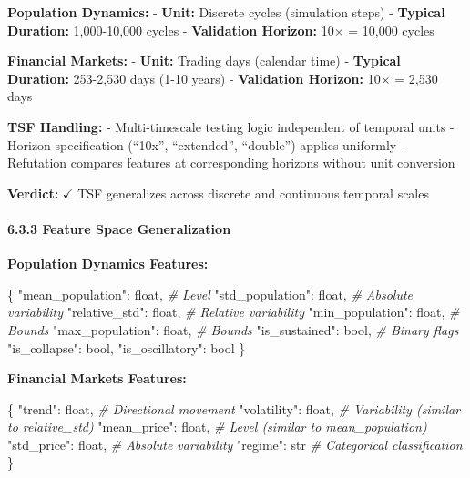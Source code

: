 \documentclass[
]{article}
\newenvironment{Shaded}{}{}
\newcommand{\BuiltInTok}[1]{\textcolor[rgb]{0.00,0.50,0.00}{#1}}
\newcommand{\CommentTok}[1]{\textcolor[rgb]{0.38,0.63,0.69}{\textit{#1}}}
\newcommand{\NormalTok}[1]{#1}
\newcommand{\StringTok}[1]{\textcolor[rgb]{0.25,0.44,0.63}{#1}}
\begin{document}
\textbf{Population Dynamics:} - \textbf{Unit:} Discrete cycles
(simulation steps) - \textbf{Typical Duration:} 1,000-10,000 cycles -
\textbf{Validation Horizon:} 10× = 10,000 cycles

\textbf{Financial Markets:} - \textbf{Unit:} Trading days (calendar
time) - \textbf{Typical Duration:} 253-2,530 days (1-10 years) -
\textbf{Validation Horizon:} 10× = 2,530 days

\textbf{TSF Handling:} - Multi-timescale testing logic independent of
temporal units - Horizon specification (``10x'', ``extended'',
``double'') applies uniformly - Refutation compares features at
corresponding horizons without unit conversion

\textbf{Verdict:} $\checkmark$ TSF generalizes across discrete and continuous
temporal scales

\paragraph{6.3.3 Feature Space
Generalization}\label{feature-space-generalization}

\textbf{Population Dynamics Features:}

\begin{Shaded}
\begin{Highlighting}[]
\NormalTok{\{}
    \StringTok{"mean\_population"}\NormalTok{: }\BuiltInTok{float}\NormalTok{,      }\CommentTok{\# Level}
    \StringTok{"std\_population"}\NormalTok{: }\BuiltInTok{float}\NormalTok{,        }\CommentTok{\# Absolute variability}
    \StringTok{"relative\_std"}\NormalTok{: }\BuiltInTok{float}\NormalTok{,          }\CommentTok{\# Relative variability}
    \StringTok{"min\_population"}\NormalTok{: }\BuiltInTok{float}\NormalTok{,        }\CommentTok{\# Bounds}
    \StringTok{"max\_population"}\NormalTok{: }\BuiltInTok{float}\NormalTok{,        }\CommentTok{\# Bounds}
    \StringTok{"is\_sustained"}\NormalTok{: }\BuiltInTok{bool}\NormalTok{,           }\CommentTok{\# Binary flags}
    \StringTok{"is\_collapse"}\NormalTok{: }\BuiltInTok{bool}\NormalTok{,}
    \StringTok{"is\_oscillatory"}\NormalTok{: }\BuiltInTok{bool}
\NormalTok{\}}
\end{Highlighting}
\end{Shaded}

\textbf{Financial Markets Features:}

\begin{Shaded}
\begin{Highlighting}[]
\NormalTok{\{}
    \StringTok{"trend"}\NormalTok{: }\BuiltInTok{float}\NormalTok{,                 }\CommentTok{\# Directional movement}
    \StringTok{"volatility"}\NormalTok{: }\BuiltInTok{float}\NormalTok{,            }\CommentTok{\# Variability (similar to relative\_std)}
    \StringTok{"mean\_price"}\NormalTok{: }\BuiltInTok{float}\NormalTok{,            }\CommentTok{\# Level (similar to mean\_population)}
    \StringTok{"std\_price"}\NormalTok{: }\BuiltInTok{float}\NormalTok{,             }\CommentTok{\# Absolute variability}
    \StringTok{"regime"}\NormalTok{: }\BuiltInTok{str}                   \CommentTok{\# Categorical classification}
\NormalTok{\}}
\end{Highlighting}
\end{Shaded}
\end{document}

